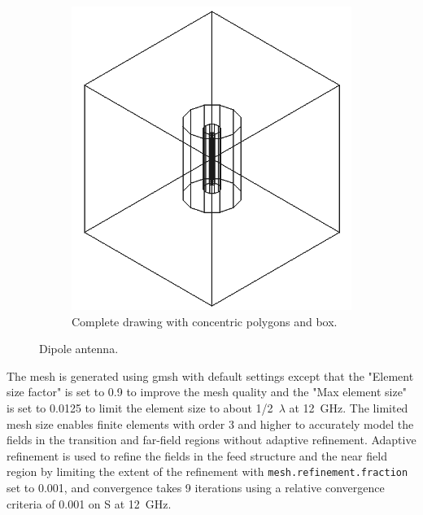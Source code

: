 \documentclass[titlepage]{article}
\renewcommand\_{\textunderscore\linebreak[1]}
\begin{document}
\begin{figure}[H]
\begin{subfigure}[t]{0.32\textwidth}
     \includegraphics[width=1\linewidth]{../regression/OpenParEM3D/antenna/dipole_study/screenshots/dipole_boxed}
     \caption{Complete drawing with concentric polygons and box.}
  \end{subfigure}
  \caption{Dipole antenna.}
  \label{fig:dipole_antenna}
\end{figure}

The mesh is generated using gmsh with default settings except that the "Element size factor" is set to 0.9 to improve the mesh quality and the "Max element size" is set to 0.0125 to limit the element size to about 1/2~$\lambda$ at 12~GHz. The limited mesh size enables finite elements with order 3 and higher to accurately model the fields in the transition and far-field regions without adaptive refinement.  Adaptive refinement is used to refine the fields in the feed structure and the near field region by limiting the extent of the refinement with \texttt{mesh.refinement.fraction} set to 0.001, and convergence takes 9 iterations using a relative convergence criteria of 0.001 on S at 12~GHz.
\end{document}
